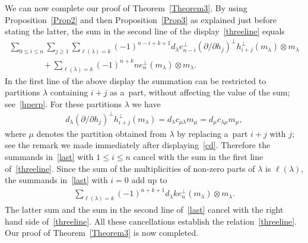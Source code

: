 We can now complete our proof of Theorem~\ref{Theorem3}.
By using Proposition~\ref{Prop2} and then Proposition~\ref{Prop3}
as explained just before stating the latter, the sum in the
second line of the display~\eqref{threeline} equals
\begin{gather}
\sum_{0\le i\le n}\sum_{j\ge1}\sum_{\ell(\lambda)=k}(-1)^{n-i+k+1}
d_\lambda e_{n-i}^{\perp}(\partial /\partial h_j)^{\perp}h_{i+j}^{\perp}(m_\lambda)\otimes m_\lambda
\nonumber
\\
\qquad\qquad
{}+\sum_{\ell(\lambda)=k}(-1)^{n+k}ne_n^{\perp}(m_\lambda)\otimes m_\lambda.
\label{last}
\end{gather}
In  the f\/irst line of the above display the summation can be restricted to partitions $\lambda$ containing
$i+j$ as a~part, without af\/fecting the value of the sum; see~\eqref{hperp}.
For these partitions $\lambda$ we have
\begin{gather*}
d_\lambda(\partial /\partial h_j)^{\perp}
h_{i+j}^{\perp}(m_\lambda)=d_\lambda c_{\mu\lambda}m_\mu=d_\mu c_{\lambda\mu}m_\mu,
\end{gather*}
where $\mu$ denotes the partition obtained from $\lambda$ by replacing a~part $i+j$ with $j$; see the
remark we made immediately after displaying~\eqref{cd}.
Therefore the summands in~\eqref{last} with $1\le i\le n$ cancel with the sum in the f\/irst line
of~\eqref{threeline}.
Since the sum of the multiplicities of non-zero parts of $\lambda$ is $\ell(\lambda)$, the summands
in~\eqref{last} with $i=0$ add up to
\begin{gather*}
\sum_{\ell(\lambda)=k}(-1)^{n+k+1}d_\lambda ke_n^{\perp}(m_\lambda)\otimes m_\lambda.
\end{gather*}
The  latter sum and the sum in the second line of~\eqref{last} cancel with the right hand side
of~\eqref{threeline}.
All these cancellations establish the relation~\eqref{threeline}.
Our proof of Theorem~\ref{Theorem3} is now completed.

